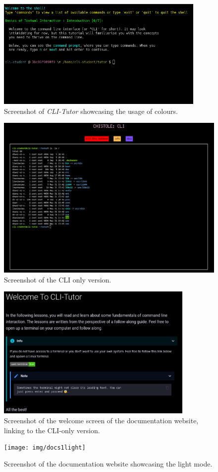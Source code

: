 \begin{figure}[htbp]
	\centering
	\includegraphics[width=0.9\textwidth]{img/lesson1.1}
	\caption{Screenshot of \textit{CLI-Tutor} showcasing the usage of colours.}
	\label{fig:colours}
\end{figure}

\begin{figure}[htbp]
	\centering
	\includegraphics[width=1\textwidth]{img/clionly}
	\caption{Screenshot of the CLI only version.}
	\label{fig:welcomedocs}
\end{figure}
\begin{figure}[htbp]
	\centering
	\includegraphics[width=0.85\textwidth]{img/docswelcomedark}
	\caption{Screenshot of the welcome screen of the documentation website, linking to the CLI-only version.}
	\label{fig:cliversion}
\end{figure}

\begin{figure}[htbp]
	\centering
	\texttt{[image: img/docs1light]}
	\caption{Screenshot of the documentation website showcasing the light mode.}
	\label{fig:docsweb}
\end{figure}
